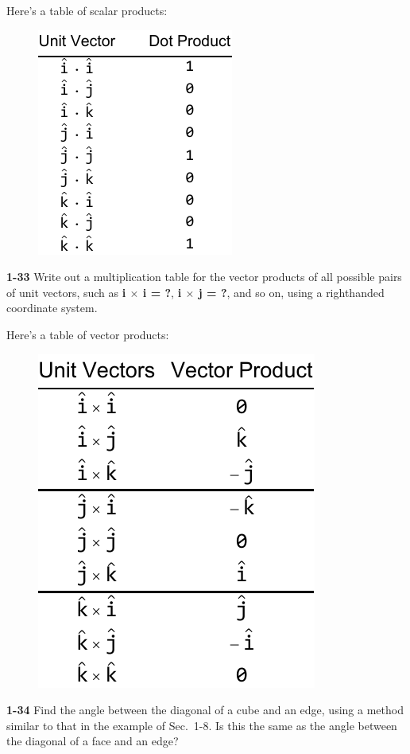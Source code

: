 \documentclass{amsart}
\begin{document}
Here's a table of scalar products:

\begin{figure}[h]
\includegraphics[scale=1.0]{1-32}
\end{figure}

\clearpage

\textbf{1-33} Write out a multiplication table for the vector products of all possible pairs of unit vectors,
such as \textbf{i $\times$ i = ?}, \textbf{i $\times $ j = ?}, and so on, using a righthanded coordinate system.

Here's a table of vector products:

\begin{figure}[h]
\includegraphics[scale=0.8]{1-33}
\end{figure}

\noindent
\textbf{1-34} Find the angle between the diagonal of a cube and an edge,
using a method similar to that in the example of Sec.\ 1-8.
Is this the same as the angle between the diagonal of a face and an edge?
\end{document}
